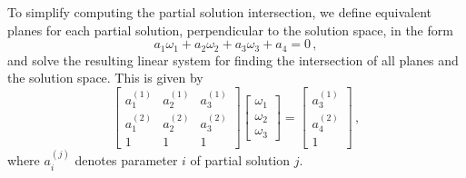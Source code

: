 \documentclass[letterpaper, 10 pt, conference]{ieeeconf}  %
\begin{document}
To simplify computing the partial solution intersection, we define equivalent planes for each partial solution, perpendicular to the solution space, in the form
\begin{equation}
   a_1\omega_1 + a_2\omega_2 +a_3\omega_3 + a_4 = 0\,, \label{eqn:3sen_plane_eq}
\end{equation}
and solve the resulting linear system for finding the intersection of all planes and the solution space. This is given by
\begin{equation}
   \begin{bmatrix}
      a_1^{(1)} & a_2^{(1)} & a_3^{(1)} \\
      a_1^{(2)} & a_2^{(2)} & a_3^{(2)} \\
      1 & 1 & 1
   \end{bmatrix}
   \begin{bmatrix}
      \omega_1 \\
      \omega_2 \\
      \omega_3
   \end{bmatrix}
   =
   \begin{bmatrix}
      a_3^{(1)} \\
      a_4^{(2)} \\
      1
   \end{bmatrix}\,, \label{eqn:3sen_plane_sol_eq}
\end{equation}
where $a_i^{(j)}$ denotes parameter $i$ of partial solution $j$.
\end{document}

